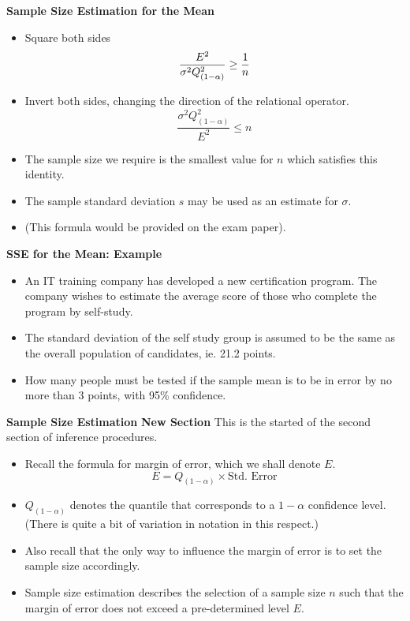 
\textbf{Sample Size Estimation for the Mean}
\begin{itemize}
\item  Square both sides
\[ \frac{E^2}{\sigma^2 Q^2_{(1-\alpha)}} \geq {1 \over n } \]
\item  Invert both sides, changing the direction of the relational operator.
\[ \frac{\sigma^2 Q^2_{(1-\alpha)}}{E^2} \leq n \]

\item  The sample size we require is the smallest value for $n$ which satisfies this identity.
\item  The sample standard deviation $s$ may be used as an estimate for $\sigma$.
\item  (This formula would be provided on the exam paper).
\end{itemize}



\textbf{SSE for the Mean: Example}
\begin{itemize}
\item  An IT training company has developed a new certification program. The company wishes to estimate the average score of those who complete the program by self-study.  \item  The standard deviation of the self study group is assumed to be the same as the overall population of candidates, ie. 21.2 points.
\item  How many people must be tested if the sample mean is to be in error by no more than 3 points, with 95\% confidence.
\end{itemize}


\textbf{Sample Size Estimation}
\textbf{New Section} This is the started of the second section of inference procedures.
\begin{itemize} \item  Recall the formula for margin of error, which we shall denote $E$.
\[  E = Q_{(1-\alpha)} \times \mbox{Std. Error}\]

\item  $Q_{(1-\alpha)}$ denotes the quantile that corresponds to a $1-\alpha$ confidence level. (There is quite a bit of variation in notation in this respect.)
\item  Also recall that the only way to influence the margin of error is to set the sample size accordingly.

\item  Sample size estimation describes the selection of a sample size $n$ such that the margin of error does not exceed a pre-determined level $E$.
\end{itemize}


